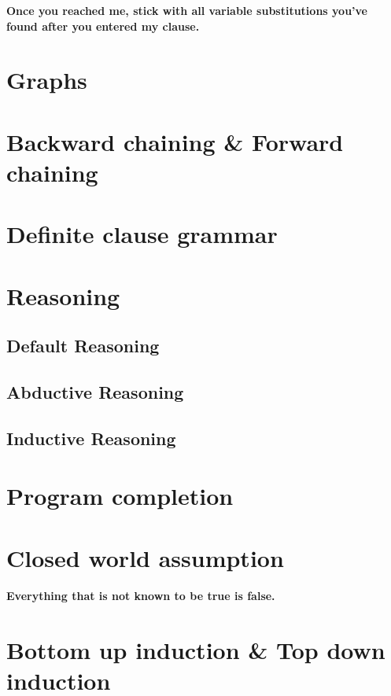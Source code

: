 \begin{displayquote}
\textbf{
Once you reached me, stick with all variable substitutions you've found after you entered my clause.}
\end{displayquote}
\section{Graphs}
\section{Backward chaining \& Forward chaining}
\section{Definite clause grammar}
\section{Reasoning}
\subsection{Default Reasoning}
\subsection{Abductive Reasoning}
\subsection{Inductive Reasoning}
\section{Program completion}
\section{Closed world assumption}
\begin{displayquote}
\textbf{
Everything that is not known to be true is false.}
\end{displayquote}
\section{Bottom up induction \& Top down induction}
